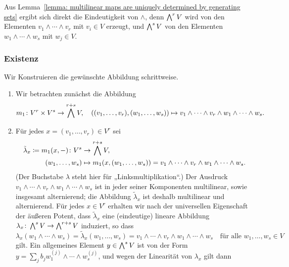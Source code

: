 Aus Lemma~\ref{lemma: multilinear maps are uniquely determined by generating sets} ergibt sich direkt die Eindeutigkeit von $\wedge$, denn $\bigwedge^{r} V$ wird von den Elementen $v_1 \wedge \dotsb \wedge v_r$ mit $v_i \in V$ erzeugt, und $\bigwedge^{s} V$ von den Elementen $w_1 \wedge \dotsb \wedge w_s$ mit $w_j \in V$.



\subsubsection{Existenz}
Wir Konstruieren die gewünschte Abbildung schrittweise.

\begin{enumerate}
  \item
    Wir betrachten zunächst die Abbildung
    \[
              m_1
      \colon  V^r \times V^s
      \to     \bigwedge^{r+s} V,
      \quad   ((v_1, \dotsc, v_r), (w_1, \dotsc, w_s))
      \mapsto v_1 \wedge \dotsb \wedge v_r \wedge w_1 \wedge \dotsb \wedge w_s.
    \]
  \item
    Für jedes $x = (v_1, \dotsc, v_r) \in V^r$ sei
    \begin{align*}
                  \tilde{\lambda}_x
       \coloneqq  m_1(x, -)
       \colon     V^s
      &\to        \bigwedge^{r+s} V,
      \\
                  (w_1, \dotsc, w_s)
      &\mapsto    m_1(x, (w_1, \dotsc, w_s))
       =          v_1 \wedge \dotsb \wedge v_r \wedge w_1 \wedge \dotsb \wedge w_s.
    \end{align*}
    (Der Buchstabe $\lambda$ steht hier für „Linksmultiplikation“.)
    Der Ausdruck $v_1 \wedge \dotsb \wedge v_r \wedge w_1 \wedge \dotsb \wedge w_s$ ist in jeder seiner Komponenten multilinear, sowie insgesamt alternierend;
    die Abbildung $\tilde{\lambda}_x$ ist deshalb multilinear und alternierend.
    Für jedes $x \in V^r$ erhalten wir nach der universellen Eigenschaft der äußeren Potent, dass $\tilde{\lambda}_x$ eine (eindeutige) lineare Abbildung $\lambda_x \colon \bigwedge^{s} V \to \bigwedge^{r+s} V$ induziert, so dass
    \[
        \lambda_x( w_1 \wedge \dotsb \wedge w_s )
      = \tilde{\lambda}_x(w_1, \dotsc, w_s)
      = v_1 \wedge \dotsb \wedge v_r \wedge w_1 \wedge \dotsb \wedge w_s
      \quad
      \text{für alle $w_1, \dotsc, w_s \in V$}
    \]
    gilt.
    Ein allgemeines Element $y \in \bigwedge^{s} V$ ist von der Form $y = \sum_j b_j w^{(j)}_1 \wedge \dotsb \wedge w^{(j)}_s$, und wegen der Linearität von $\lambda_x$ gilt dann

\end{enumerate}
